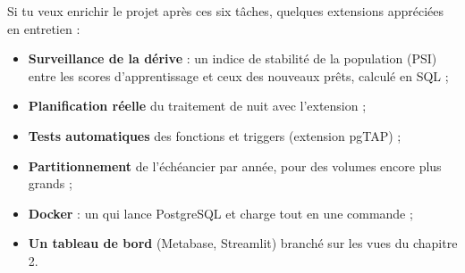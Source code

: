 Si tu veux enrichir le projet après ces six tâches, quelques extensions appréciées en entretien :
\begin{itemize}
\item \textbf{Surveillance de la dérive} : un indice de stabilité de la population (PSI) entre les scores
d'apprentissage et ceux des nouveaux prêts, calculé en SQL ;
\item \textbf{Planification réelle} du traitement de nuit avec l'extension  ;
\item \textbf{Tests automatiques} des fonctions et triggers (extension pgTAP) ;
\item \textbf{Partitionnement} de l'échéancier par année, pour des volumes encore plus grands ;
\item \textbf{Docker} : un  qui lance PostgreSQL et charge tout en une commande ;
\item \textbf{Un tableau de bord} (Metabase, Streamlit) branché sur les vues du chapitre 2.
\end{itemize}
